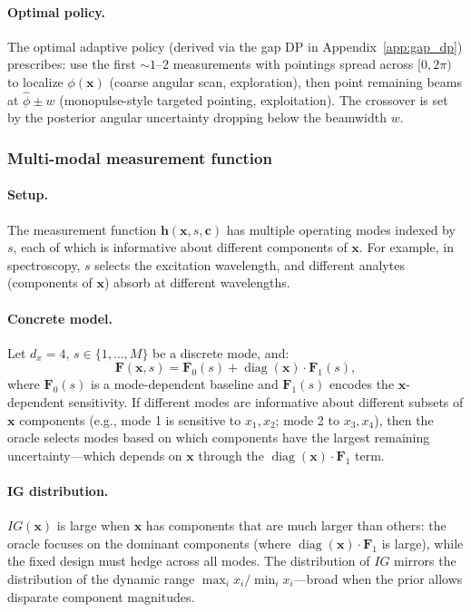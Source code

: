 \documentclass[11pt,a4paper]{article}
\newcommand{\diag}{\operatorname{diag}}
\begin{document}
\paragraph{Optimal policy.}
The optimal adaptive policy (derived via the gap DP in Appendix~\ref{app:gap_dp}) prescribes: use the first $\sim\!1$--$2$ measurements with pointings spread across $[0, 2\pi)$ to localize $\phi(\bm{x})$ (coarse angular scan, exploration), then point remaining beams at $\hat\phi \pm w$ (monopulse-style targeted pointing, exploitation).  The crossover is set by the posterior angular uncertainty dropping below the beamwidth $w$.

\subsubsection{Multi-modal measurement function}

\paragraph{Setup.}
The measurement function $\bm{h}(\bm{x}, s, \bm{c})$ has multiple operating modes indexed by $s$, each of which is informative about different components of $\bm{x}$.  For example, in spectroscopy, $s$ selects the excitation wavelength, and different analytes (components of $\bm{x}$) absorb at different wavelengths.

\paragraph{Concrete model.}
Let $d_x = 4$, $s \in \{1, \ldots, M\}$ be a discrete mode, and:
\begin{equation}
  \bm{F}(\bm{x}, s) = \bm{F}_0(s) + \diag(\bm{x}) \cdot \bm{F}_1(s),
\end{equation}
where $\bm{F}_0(s)$ is a mode-dependent baseline and $\bm{F}_1(s)$ encodes the $\bm{x}$-dependent sensitivity.  If different modes are informative about different subsets of $\bm{x}$ components (e.g., mode 1 is sensitive to $x_1, x_2$; mode 2 to $x_3, x_4$), then the oracle selects modes based on which components have the largest remaining uncertainty---which depends on $\bm{x}$ through the $\diag(\bm{x}) \cdot \bm{F}_1$ term.

\paragraph{IG distribution.}
$IG(\bm{x})$ is large when $\bm{x}$ has components that are much larger than others: the oracle focuses on the dominant components (where $\diag(\bm{x}) \cdot \bm{F}_1$ is large), while the fixed design must hedge across all modes.  The distribution of $IG$ mirrors the distribution of the dynamic range $\max_i x_i / \min_i x_i$---broad when the prior allows disparate component magnitudes.
\end{document}
